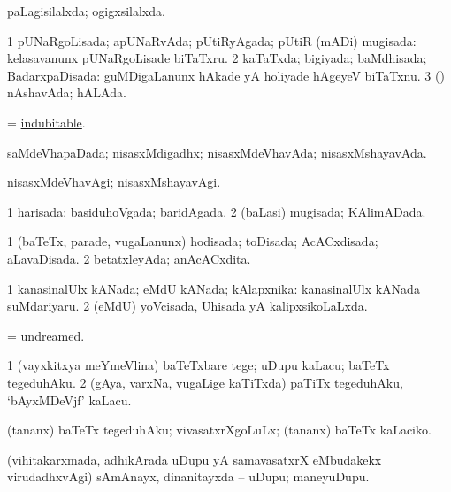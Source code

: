 \bentry
{} 
\gl{\gu}
\expl{}
\bmng
 paLagisilalxda; ogigxsilalxda. 
\emng
\eentry

\bentry
{} 
\gl{\gu}
\bmng
\bnum
\num{1} pUNaRgoLisada; apUNaRvAda; pUtiRyAgada; pUtiR (mADi) mugisada:  kelasavanunx pUNaRgoLisade biTaTxru. 
\num{2} kaTaTxda; bigiyada; baMdhisada; BadarxpaDisada:  guMDigaLanunx hAkade yA holiyade hAgeyeV biTaTxnu. 
\num{3} (\pArxparx) nAshavAda; hALAda. 
\enum
\emng
\eentry

\bentry
{} 
\gl{\gu}
\expl{}
\bmng
 = \hyperref{kandict_i.pdf}{I}{indubitable}{indubitable}. 
\emng
\eentry

\bentry
{} 
\gl{\gu}
\expl{}
\bmng
 saMdeVhapaDada; nisasxMdigadhx; nisasxMdeVhavAda; nisasxMshayavAda. 
\emng
\eentry

\bentry
{} 
\gl{\kirxvi}
\expl{}
\bmng
 nisasxMdeVhavAgi; nisasxMshayavAgi. 
\emng
\eentry

\bentry
{} 
\gl{\gu}
\expl{}
\bmng
\bnum
\num{1} harisada; basiduhoVgada; baridAgada. 
\num{2} (baLasi) mugisada; KAlimADada. 
\enum
\emng
\eentry

\bentry
{} 
\gl{\gu}
\expl{}
\bmng
\bnum
\num{1} (baTeTx, parade, \mo vugaLanunx) hodisada; toDisada; AcACxdisada; aLavaDisada. 
\num{2} betatxleyAda; anAcACxdita. 
\enum
\emng
\eentry

\bentry
{} 
\gl{\gu}
\expl{}
\bmng
\bnum
\num{1} kanasinalUlx kANada; eMdU kANada; kAlapxnika:  kanasinalUlx kANada suMdariyaru. 
\num{2} (eMdU) yoVcisada, Uhisada yA kalipxsikoLaLxda. 
\enum
\emng
\eentry

\bentry
{} 
\gl{\gu}
\expl{}
\bmng
 = \hyperlink{undreamed}{undreamed}. 
\emng
\eentry

\bentry
{} 
\gl{\sakirx}
\expl{}
\bmng
\bnum
\num{1} (vayxkitxya meYmeVlina) baTeTxbare tege; uDupu kaLacu; baTeTx tegeduhAku. 
\num{2} (gAya, varxNa, \mo vugaLige kaTiTxda) paTiTx tegeduhAku, `bAyxMDeVjf' kaLacu. 
\enum
\emng

\noindent
\gl{\akirx}
\expl{}
\bmng
(tananx) baTeTx tegeduhAku; vivasatxrXgoLuLx; (tananx) baTeTx kaLaciko. 
\emng
\eentry

\bentry
{} 
\gl{\nA}
\expl{}
\bmng
 (vihitakarxmada, adhikArada uDupu yA samavasatxrX eMbudakekx virudadhxvAgi) sAmAnayx, dinanitayxda -- uDupu; maneyuDupu. 
\emng
\eentry

